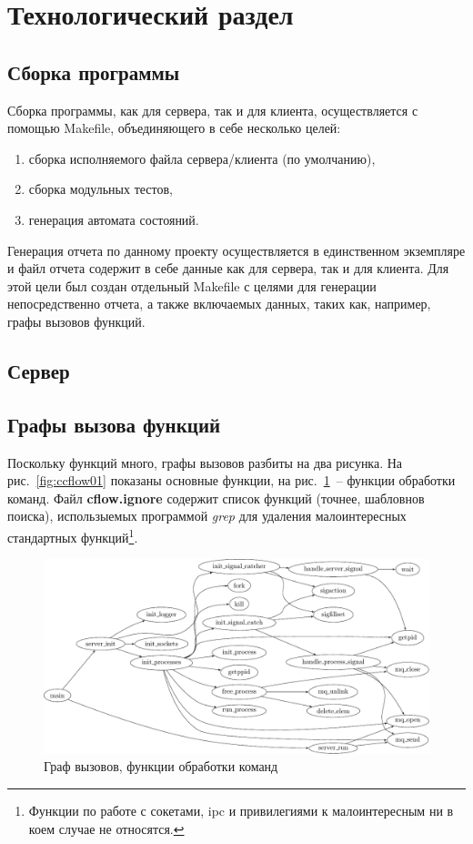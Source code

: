 \documentclass[a4paper,12pt]{report}
\begin{document}
\chapter*{Технологический раздел}

\section*{Сборка программы}

Сборка программы, как для сервера, так и для клиента, осуществляется с помощью Makefile, объединяющего в себе несколько целей:
\begin{enumerate}
\item сборка исполняемого файла сервера/клиента (по умолчанию),
\item сборка модульных тестов,
\item генерация автомата состояний.
\end{enumerate}
Генерация отчета по данному проекту осуществляется в единственном экземпляре и файл отчета содержит в себе данные как для сервера, так и для клиента. Для этой цели был создан отдельный Makefile с целями для генерации непосредственно отчета, а также включаемых данных, таких как, например, графы вызовов функций.

\section*{Сервер}

\section*{Графы вызова функций}

Поскольку функций много, графы вызовов разбиты на два рисунка. На рис.~\ref{fig:ccflow01} показаны основные функции, на рис.~\ref{fig:scflow01}~-- функции обработки команд. Файл \textbf{cflow.ignore} содержит список функций (точнее, шабловнов поиска), использыемых программой \textit{grep} для удаления малоинтересных стандартных функций\footnote{Функции по работе с сокетами, ipc и привилегиями к малоинтересным ни в коем случае не относятся.}.


\begin{figure}
\centering
\includegraphics[width=\textwidth]{include/scflow01_dot.pdf}
\caption{Граф вызовов, функции обработки команд}
\label{fig:scflow01}
\end{figure}
\end{document}
